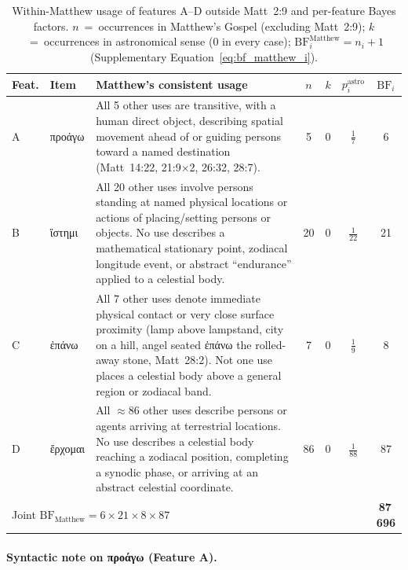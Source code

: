 \documentclass[11pt,a4paper]{article}
\newcommand{\grk}[1]{{\fontencoding{LGR}\selectfont #1}}
\newcommand{\grk}[1]{{\greekfont #1}}
\begin{document}
\begin{table}[h]
  \caption{Within-Matthew usage of features A--D outside Matt~2:9 and
    per-feature Bayes factors.
    $n$~=~occurrences in Matthew's Gospel (excluding Matt~2:9);
    $k$~=~occurrences in astronomical sense (0 in every case);
    $\mathrm{BF}_i^\text{Matthew} = n_i + 1$ (Supplementary Equation~\eqref{eq:bf_matthew_i}).}
  \label{tab:within_matthew}
  \centering
  \small
  \begin{tabular}{@{}llp{4.4cm}cccc@{}}
    \toprule
    Feat. & Item & Matthew's consistent usage & $n$ & $k$ & $p_i^\text{astro}$ & $\mathrm{BF}_i$ \\
    \midrule
    A & \grk{προάγω} &
      All 5 other uses are transitive, with a human direct object,
      describing spatial movement ahead of or guiding persons toward a
      named destination (Matt~14:22, 21:9$\times$2, 26:32, 28:7). &
      5 & 0 & $\tfrac{1}{7}$ & 6 \\[6pt]
    B & \grk{ἵστημι} &
      All 20 other uses involve persons standing at named physical
      locations or actions of placing/setting persons or objects.
      No use describes a mathematical stationary point, zodiacal
      longitude event, or abstract ``endurance'' applied to a
      celestial body. &
      20 & 0 & $\tfrac{1}{22}$ & 21 \\[6pt]
    C & \grk{ἐπάνω} &
      All 7 other uses denote immediate physical contact or very close
      surface proximity (lamp above lampstand, city on a hill, angel
      seated \grk{ἐπάνω} the rolled-away stone, Matt~28:2).
      Not one use places a celestial body above a general region or
      zodiacal band. &
      7 & 0 & $\tfrac{1}{9}$ & 8 \\[6pt]
    D & \grk{ἔρχομαι} &
      All $\approx\!86$ other uses describe persons or agents arriving
      at terrestrial locations. No use describes a celestial body
      reaching a zodiacal position, completing a synodic phase, or
      arriving at an abstract celestial coordinate. &
      86 & 0 & $\tfrac{1}{88}$ & 87 \\
    \midrule
    \multicolumn{5}{l}{Joint $\mathrm{BF}_\text{Matthew} = 6\times21\times8\times87$} &
    & \textbf{87\,696} \\
    \bottomrule
  \end{tabular}
\end{table}

\paragraph{Syntactic note on \grk{προάγω} (Feature A).}
\end{document}
